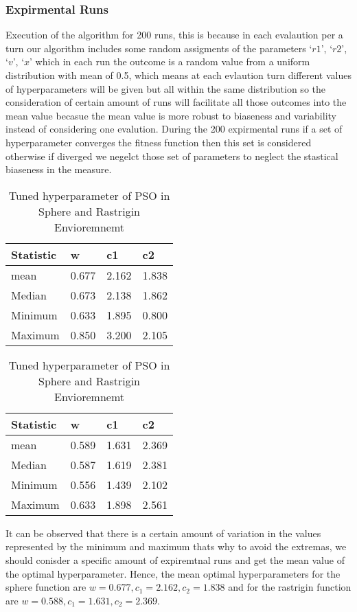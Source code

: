 \documentclass[
]{article}
\begin{document}
\hypertarget{expirmental-runs}{%
\subsubsection{Expirmental Runs}\label{expirmental-runs}}

Execution of the algorithm for 200 runs, this is because in each
evalaution per a turn our algorithm includes some random assigments of
the parameters `\(r1\)', `\(r2\)', `\(v\)', `\(x\)' which in each run
the outcome is a random value from a uniform distribution with mean of
0.5, which means at each evlaution turn different values of
hyperparameters will be given but all within the same distribution so
the consideration of certain amount of runs will facilitate all those
outcomes into the mean value becasue the mean value is more robust to
biaseness and variability instead of considering one evalution. During
the 200 expirmental runs if a set of hyperparameter converges the
fitness function then this set is considered otherwise if diverged we
negelct those set of parameters to neglect the stastical biaseness in
the measure.

\begin{table}[ht]
\centering
\begin{tabular}{llll}
\hline
Statistic & w     & c1    & c2    \\ \hline
mean      & 0.677 & 2.162 & 1.838 \\
Median    & 0.673 & 2.138 & 1.862 \\
Minimum   & 0.633 & 1.895 & 0.800 \\
Maximum   & 0.850 & 3.200 & 2.105
\end{tabular}
\centering
\begin{tabular}{llll}
\hline
Statistic & w     & c1    & c2    \\ \hline
mean      & 0.589 & 1.631 & 2.369 \\
Median    & 0.587 & 1.619 & 2.381 \\
Minimum   & 0.556 & 1.439 & 2.102 \\
Maximum   & 0.633 & 1.898 & 2.561
\end{tabular}
\caption{\label{Stathyparam}Tuned hyperparameter of PSO in Sphere and Rastrigin  Envioremnemt}
\end{table}

It can be observed that there is a certain amount of variation in the
values represented by the minimum and maximum thats why to avoid the
extremas, we should conisder a specific amount of expiremtnal runs and
get the mean value of the optimal hyperparameter. Hence, the mean
optimal hyperparameters for the sphere function are
\(w=0.677,c_1=2.162,c_2=1.838\) and for the rastrigin function are
\(w=0.588,c_1=1.631,c_2=2.369\).
\end{document}
